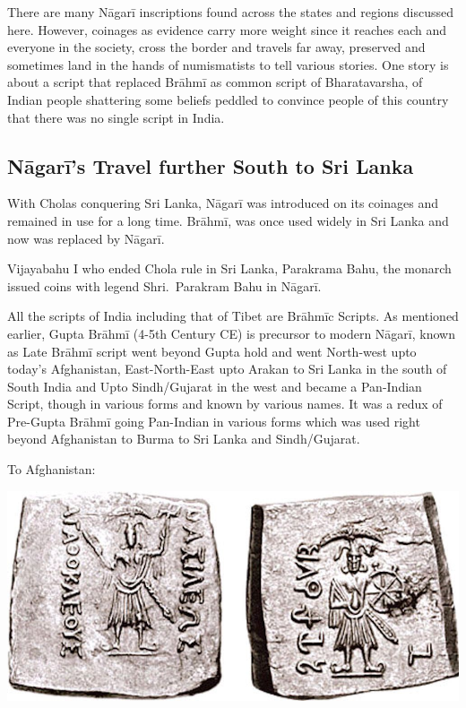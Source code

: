 There are many Nāgarī inscriptions found across the states and regions discussed here. However, coinages as evidence carry more weight since it reaches each and everyone in the society, cross the border and travels far away, preserved and sometimes land in the hands of numismatists to tell various stories. One story is about a script that replaced Brāhmī as common script of Bharatavarsha, of Indian people shattering some beliefs peddled to convince people of this country that there was no single script in India.


\subsection*{Nāgarī’s Travel further South to Sri Lanka}

With Cholas conquering Sri Lanka, Nāgarī was introduced on its coinages and remained in use for a long time. Brāhmī, was once used widely in Sri Lanka and now was replaced by Nāgarī.

Vijayabahu I who ended Chola rule in Sri Lanka, Parakrama Bahu, the monarch issued coins with legend Shri.\ Parakram Bahu in Nāgarī.

All the scripts of India including that of Tibet are Brāhmīc Scripts. As mentioned earlier, Gupta Brāhmī (4-5th Century CE) is precursor to modern Nāgarī, known as Late Brāhmī script went beyond Gupta hold and went North-west upto today’s Afghanistan, East-North-East upto Arakan to Sri Lanka in the south of South India and Upto Sindh/Gujarat in the west and became a Pan-Indian Script, though in various forms and known by various names. It was a redux of Pre-Gupta Brāhmī going Pan-Indian in various forms which was used right beyond Afghanistan to Burma to Sri Lanka and Sindh/Gujarat.

To Afghanistan:

\vskip 5pt

\centerline{\includegraphics[scale=0.95]{"images/article-06/art06-fig24.jpg"}}

